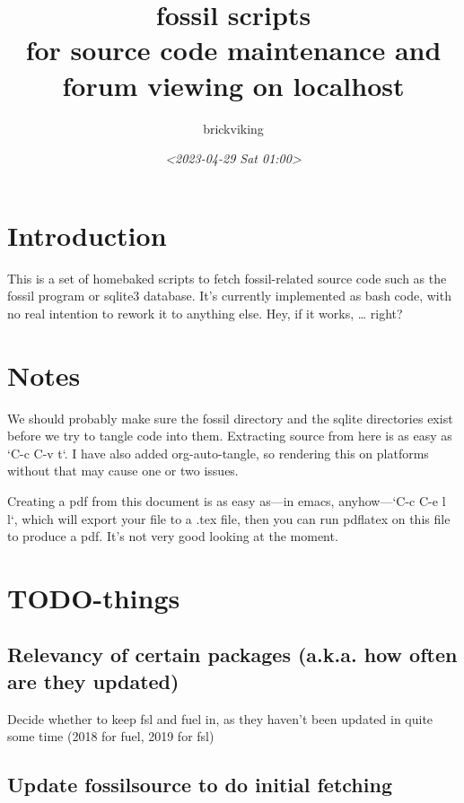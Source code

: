 \documentclass[11pt]{article}
\author{brickviking}
\date{\textit{<2023-04-29 Sat 01:00>}}
\title{fossil scripts\\\medskip
\large for source code maintenance and forum viewing on localhost}
\begin{document}
\maketitle
\setcounter{tocdepth}{2}
\tableofcontents



\section*{Introduction}
\label{sec:orgd1ee123}

This is a set of homebaked scripts to fetch fossil-related source code such as the fossil program
or sqlite3 database. It's currently implemented as bash code, with no real intention to rework it to anything
else. Hey, if it works, \ldots{} right?

\section*{Notes}
\label{sec:org1eb5751}

We should probably make sure the fossil directory and the sqlite directories exist before we
try to tangle code into them. Extracting source from here is as easy as `C-c C-v t`.
I have also added org-auto-tangle, so rendering this on platforms without that may cause one or two issues.

Creating a pdf from this document is as easy as—in emacs, anyhow—`C-c C-e l l`, which will export your
file to a .tex file, then you can run pdflatex on this file to produce a pdf. It's not very good looking
at the moment.

\section*{TODO-things}
\label{sec:org8a09195}

\subsection*{Relevancy of certain packages (a.k.a. how often are they updated)}
\label{sec:org28aca34}

Decide whether to keep fsl and fuel in, as they haven't been updated in quite some time (2018 for fuel,
2019 for fsl)

\subsection*{Update fossilsource to do initial fetching}
\label{sec:orgffbe92c}
\end{document}
